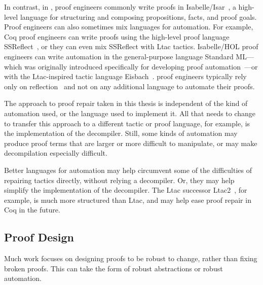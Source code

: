 In contrast, in , proof engineers commonly write proofs in Isabelle/Isar~\cite{wenzel1999isar, Wenzel2007isar}, a high-level
language for structuring and composing propositions, facts, and proof goals.
Proof engineers can also sometimes mix languages for automation.
For example, Coq proof engineers can write proofs using the high-level proof language SSReflect~\cite{Gonthier2010, Gonthier2008},
or they can even mix SSReflect with Ltac tactics.
Isabelle/HOL proof engineers can write automation in the general-purpose language Standard ML---which was originally introduced specifically
for developing proof automation~\cite{Gordon1978}---or with the Ltac-inspired tactic language Eisbach~\cite{Matichuk2015EisbachAP}.
 proof engineers typically rely only on reflection~\cite{Demers95reflectionin, harrison-reflection, van2012engineering} and not
on any additional language to automate their proofs.

The approach to proof repair taken in this thesis is independent of the kind of automation used, or the language used to implement it.
All that needs to change to transfer this approach to a different tactic or proof language, for example,
is the implementation of the decompiler.
Still, some kinds of automation may produce proof terms that are larger or more difficult to manipulate,
or may make decompilation especially difficult.

Better languages for automation may help circumvent some of the difficulties of repairing tactics directly, without relying a decompiler.
Or, they may help simplify the implementation of the decompiler.
The Ltac successor Ltac2~\cite{ltac2}, for example, is much more structured than Ltac, and may help ease proof repair in Coq in the future.

\subsection{Proof Design}
\label{sec:design}

Much work focuses on designing proofs
to be robust to change, rather than fixing broken proofs.
This can take the form of robust abstractions or robust automation.


